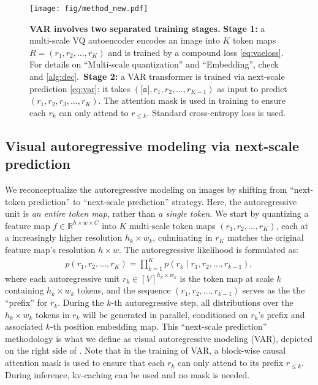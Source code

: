 \vspace{8pt}
\begin{figure}[htb]
\begin{center}
    \texttt{[image: fig/method\_new.pdf]}
\end{center}
\vspace{-4pt}
\caption{\small
\textbf{VAR involves two separated training stages.}
\textbf{Stage 1:} a multi-scale VQ autoencoder encodes an image into $K$ token maps $R=(r_1, r_2, \dots, r_K)$ and is trained by a compound loss \eqref{eq:vaeloss}.
For details on ``Multi-scale quantization'' and ``Embedding'', check  and \ref{alg:dec}.
\,\textbf{Stage 2:} a VAR transformer is trained via next-scale prediction \eqref{eq:var}: it takes $(\texttt{[s]}, r_1, r_2, \dots, r_{K-1})$ as input to predict $(r_1, r_2, r_3, \dots, r_K)$. The attention mask is used in training to ensure each $r_k$ can only attend to $r_{\le k}$. Standard cross-entropy loss is used.
\vspace{-4pt}
}
\label{fig:method}
\end{figure}

\subsection{Visual autoregressive modeling via next-scale prediction} \label{sec:var}
\vspace{-2pt}

We reconceptualize the autoregressive modeling on images by shifting from ``next-token prediction'' to ``next-scale prediction'' strategy.
Here, the autoregressive unit is \textit{an entire token map}, rather than \textit{a single token}.
We start by quantizing a feature map $f \in \mathbb{R}^{h\times w\times C}$ into $K$ multi-scale token maps $(r_1, r_2, \dots, r_K)$, each at a increasingly  higher resolution $h_k\times w_k$, culminating in $r_K$ matches the original feature map's resolution $h\times w$.
The autoregressive likelihood is formulated as:
\begin{align}
    p(r_1, r_2, \dots, r_K) = \prod_{k=1}^{K} p(r_k \mid r_1, r_2, \dots, r_{k-1}),  \label{eq:var}
\end{align}
where each autoregressive unit $r_k \in [V]^{h_k \times w_k}$ is the token map at scale $k$ containing $h_k \times w_k$ tokens, and the sequence $(r_1, r_2, \dots, r_{k-1})$ serves as the the ``prefix'' for $r_k$.
During the $k$-th autoregressive step, all distributions over the $h_k \times w_k$ tokens in $r_k$ will be generated in parallel, conditioned on $r_k$'s prefix and associated $k$-th position embedding map.
This ``next-scale prediction'' methodology is what we define as visual autoregressive modeling (VAR), depicted on the right side of .
Note that in the training of VAR, a block-wise causal attention mask is used to ensure that each $r_k$ can only attend to its prefix $r_{\le k}$.
During inference, kv-caching can be used and no mask is needed.

